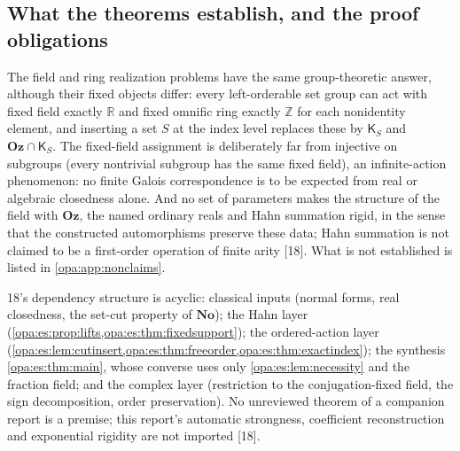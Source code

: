 \documentclass[11pt,oneside]{article}
\numberwithin{equation}{section}
\theoremstyle{definition}
\theoremstyle{remark}
\newcommand{\No}{\mathbf{No}}
\newcommand{\Oz}{\mathbf{Oz}}
\newcommand{\R}{\mathbb R}
\newcommand{\Z}{\mathbb Z}
\newcommand{\src}[1]{\textup{\textsf{\small[#1]}}}
\begin{document}
\subsection{What the theorems establish, and the proof obligations}

The field and ring realization problems have the same group-theoretic answer, although their fixed objects differ: every left-orderable set
group can act with fixed field exactly $\R$ and fixed omnific ring exactly $\Z$ for each nonidentity element, and inserting a set $S$ at the
index level replaces these by $\mathsf K_S$ and $\Oz\cap\mathsf K_S$. The fixed-field assignment is deliberately far from injective on subgroups
(every nontrivial subgroup has the same fixed field), an infinite-action phenomenon: no finite Galois correspondence is to be expected from
real or algebraic closedness alone. And no set of parameters makes the structure of the field with $\Oz$, the named ordinary reals and Hahn
summation rigid, in the sense that the constructed automorphisms preserve these data; Hahn summation is not claimed to be a first-order
operation of finite arity \src{18}. What is not established is listed in \cref{opa:app:nonclaims}.

18's dependency structure is acyclic: classical inputs (normal forms, real closedness, the set-cut property of $\No$); the Hahn
layer (\cref{opa:es:prop:lifts,opa:es:thm:fixedsupport}); the ordered-action layer
(\cref{opa:es:lem:cutinsert,opa:es:thm:freeorder,opa:es:thm:exactindex}); the synthesis \cref{opa:es:thm:main}, whose converse uses only
\cref{opa:es:lem:necessity} and the fraction field; and the complex layer (restriction to the conjugation-fixed field, the sign
decomposition, order preservation). No unreviewed theorem of a companion report is a premise; this report's automatic strongness,
coefficient reconstruction and exponential rigidity are not imported \src{18}.
\end{document}
